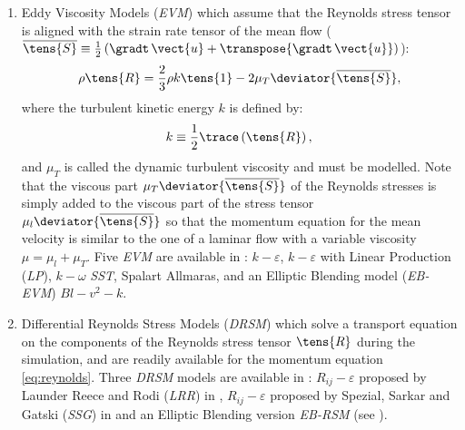 \begin{enumerate}[ label=\roman{*}/, ref=(\roman{*})]
\item Eddy Viscosity Models (\emph{EVM}) which assume that the Reynolds stress tensor is aligned with
the strain rate tensor of the mean flow ($\overline{\tens{S}} \equiv \frac{1}{2} \left( \gradt \, \vect{u}+ \transpose{\gradt \, \vect{u}} \right)$):
%
\begin{equation}\label{eq:goveqn:evm_hypothesis}
\rho \tens{R} = \dfrac{2}{3}\rho  k \tens{1} - 2 \mu_T \deviator{\overline{\tens{S}}},
\end{equation}
where the turbulent kinetic energy $k$ is defined by:
%
\begin{equation}\label{eq:goveqn:tke_def}
k \equiv \dfrac{1}{2} \trace \left( \tens{R}\right),
\end{equation}
and $\mu_T$ is called the dynamic turbulent viscosity and must be modelled.
Note that the viscous part $\mu_T\deviator{\overline{\tens{S}}}$ of the Reynolds stresses is simply added to the viscous part of the
stress tensor $\mu_l\deviator{\overline{\tens{S}}}$ so that the momentum equation for the mean velocity is similar to the one of a laminar
flow with a variable viscosity $\mu = \mu_l +\mu_T$. 
 Five \emph{EVM} are available in \CS:
$k-\varepsilon$, $k-\varepsilon$ with Linear Production (\emph{LP}), $k-\omega$ \emph{SST}, Spalart Allmaras, and an Elliptic Blending model (\emph{EB-EVM}) $Bl-v^2-k$.

\item Differential Reynolds Stress Models (\emph{DRSM}) which solve
a transport equation on the components of the Reynolds stress tensor $\tens{R}$ 
during the simulation, and are readily available for the momentum
equation \eqref{eq:reynolds}. Three \emph{DRSM} models are available in \CS: $R_{ij}-\varepsilon$ proposed by Launder Reece and Rodi (\emph{LRR}) in \cite{launder:},
$R_{ij}-\varepsilon$ proposed by Spezial, Sarkar and Gatski (\emph{SSG}) in \cite{spezial:} and an Elliptic Blending version \emph{EB-RSM} (see \cite{}).
%

\end{enumerate}


